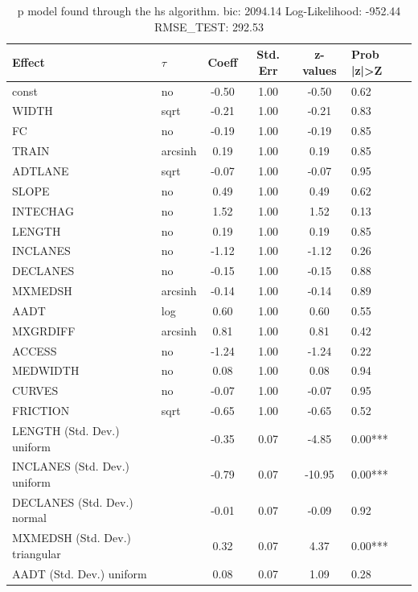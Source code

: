 \begin{table}
	\caption{p model found through the hs algorithm. bic: 2094.14 Log-Likelihood: -952.44 RMSE_TEST: 292.53}
	\begin{center}
		\begin{tabular}{|l|l|c|c|c|l|}
			\hline
			Effect & $\tau$ & Coeff & Std. Err & z-values & Prob |z|>Z \\
			\hline
			const & no & -0.50 & 1.00 & -0.50 & 0.62 \\
			\hline
			WIDTH & sqrt & -0.21 & 1.00 & -0.21 & 0.83 \\
			\hline
			FC & no & -0.19 & 1.00 & -0.19 & 0.85 \\
			\hline
			TRAIN & arcsinh & 0.19 & 1.00 & 0.19 & 0.85 \\
			\hline
			ADTLANE & sqrt & -0.07 & 1.00 & -0.07 & 0.95 \\
			\hline
			SLOPE & no & 0.49 & 1.00 & 0.49 & 0.62 \\
			\hline
			INTECHAG & no & 1.52 & 1.00 & 1.52 & 0.13 \\
			\hline
			LENGTH & no & 0.19 & 1.00 & 0.19 & 0.85 \\
			\hline
			INCLANES & no & -1.12 & 1.00 & -1.12 & 0.26 \\
			\hline
			DECLANES & no & -0.15 & 1.00 & -0.15 & 0.88 \\
			\hline
			MXMEDSH & arcsinh & -0.14 & 1.00 & -0.14 & 0.89 \\
			\hline
			AADT & log & 0.60 & 1.00 & 0.60 & 0.55 \\
			\hline
			MXGRDIFF & arcsinh & 0.81 & 1.00 & 0.81 & 0.42 \\
			\hline
			ACCESS & no & -1.24 & 1.00 & -1.24 & 0.22 \\
			\hline
			MEDWIDTH & no & 0.08 & 1.00 & 0.08 & 0.94 \\
			\hline
			CURVES & no & -0.07 & 1.00 & -0.07 & 0.95 \\
			\hline
			FRICTION & sqrt & -0.65 & 1.00 & -0.65 & 0.52 \\
			\hline
			LENGTH (Std. Dev.) uniform &  & -0.35 & 0.07 & -4.85 & 0.00*** \\
			\hline
			INCLANES (Std. Dev.) uniform &  & -0.79 & 0.07 & -10.95 & 0.00*** \\
			\hline
			DECLANES (Std. Dev.) normal &  & -0.01 & 0.07 & -0.09 & 0.92 \\
			\hline
			MXMEDSH (Std. Dev.) triangular &  & 0.32 & 0.07 & 4.37 & 0.00*** \\
			\hline
			AADT (Std. Dev.) uniform &  & 0.08 & 0.07 & 1.09 & 0.28 \\

\end{tabular}
\end{center}
\end{table}
